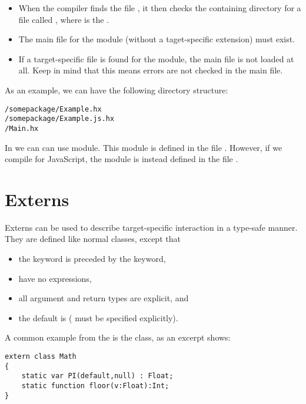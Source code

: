 \begin{itemize}
	\item When the compiler finds the file , it then checks the containing directory for a file called , where  is the .
	\item The main file for the module (without a taget-specific extension) must exist.
	\item If a target-specific file is found for the module, the main file is not loaded at all. Keep in mind that this means errors are not checked in the main file.
\end{itemize}

As an example, we can have the following directory structure:

\begin{lstlisting}
/somepackage/Example.hx
/somepackage/Example.js.hx
/Main.hx
\end{lstlisting}

In  we can can use  module. This module is defined in the file . However, if we compile for JavaScript, the module is instead defined in the file .


\section{Externs}
\label{lf-externs}

Externs can be used to describe target-specific interaction in a type-safe manner. They are defined like normal classes, except that

\begin{itemize}
	\item the  keyword is preceded by the  keyword,
	\item {} have no expressions,
	\item all argument and return types are explicit, and
	\item the default  is  ( must be specified explicitly).
\end{itemize}

A common example from the  is the  class, as an excerpt shows:

\begin{lstlisting}
extern class Math
{
	static var PI(default,null) : Float;
	static function floor(v:Float):Int;
}
\end{lstlisting}

